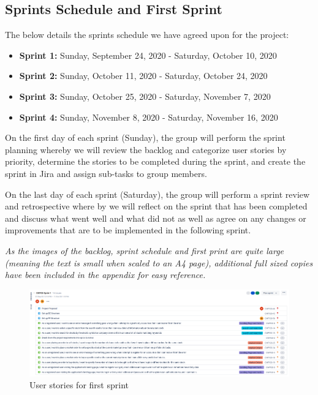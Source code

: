 \subsection{Sprints Schedule and First Sprint}
    \label{subsec:sprint_schedule}

The below details the sprints schedule we have agreed upon for the project:
\begin{itemize}
    \item \textbf{Sprint 1:} Sunday, September 24, 2020 - Saturday, October 10, 2020
    \item \textbf{Sprint 2:} Sunday, October 11, 2020 - Saturday, October 24, 2020 
    \item \textbf{Sprint 3:} Sunday, October 25, 2020 - Saturday, November 7, 2020 
    \item \textbf{Sprint 4:} Sunday, November 8, 2020 - Saturday, November 16, 2020
\end{itemize}


On the first day of each sprint (Sunday), the group will perform the sprint planning whereby we will review the backlog and categorize user stories by priority, determine the stories to be completed during the sprint, and create the sprint in Jira and assign sub-tasks to group members.

On the last day of each sprint (Saturday), the group will perform a sprint review and retrospective where by we will reflect on the sprint that has been completed and discuss what went well and what did not as well as agree on any changes or improvements that are to be implemented in the following sprint.


\textit{As the images of the backlog, sprint schedule and first print are quite large (meaning the text is small when scaled to an A4 page), additional full sized copies have been included in the appendix for easy reference.}

\break
    \thispagestyle{empty} 
    \begin{landscape}
        \vspace{3cm}
        \begin{figure}[h]
            \centering
            \includegraphics[scale = 0.45]{./4_user_stories/sprint1.png}
            \caption{User stories for first sprint}
            \label{fig:sprint1}
        \end{figure}
    
    \end{landscape}


